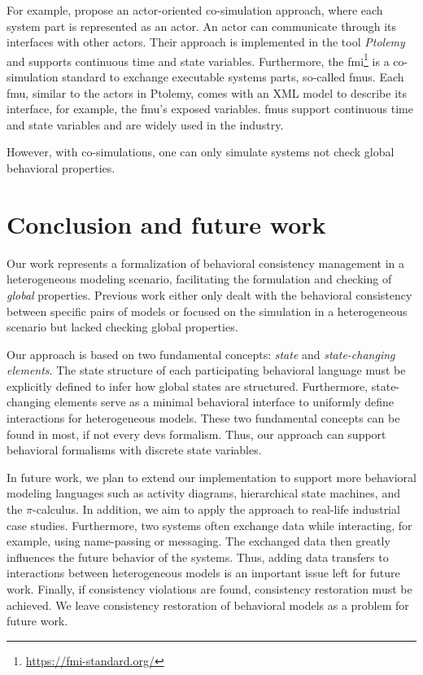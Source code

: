 \documentclass{jot}
\begin{document}
For example, \cite{ekerTamingHeterogeneityPtolemy2003} propose an actor-oriented co-simulation approach, where each system part is represented as an actor.
An actor can communicate through its interfaces with other actors.
Their approach is implemented in the tool \textit{Ptolemy} and supports continuous time and state variables.
Furthermore, the \gls*{fmi}\footnote{\url{https://fmi-standard.org/}} is a co-simulation standard to exchange executable systems parts, so-called \glspl*{fmu}.
Each \gls*{fmu}, similar to the actors in Ptolemy, comes with an XML model to describe its interface, for example, the \gls*{fmu}'s exposed variables.
\glspl*{fmu} support continuous time and state variables and are widely used in the industry.

However, with co-simulations, one can only simulate systems not check global behavioral properties.

\section{Conclusion and future work} \label{sec:conclusion_and_future_work}
Our work represents a formalization of behavioral consistency management in a heterogeneous modeling scenario, facilitating the formulation and checking of \textit{global} properties.
Previous work either only dealt with the behavioral consistency between specific pairs of models or focused on the simulation in a heterogeneous scenario but lacked checking global properties.

Our approach is based on two fundamental concepts: \textit{state} and \textit{state-changing elements}.
The state structure of each participating behavioral language must be explicitly defined to infer how global states are structured.
Furthermore, state-changing elements serve as a minimal behavioral interface to uniformly define interactions for heterogeneous models.
These two fundamental concepts can be found in most, if not every \gls*{devs} formalism.
Thus, our approach can support behavioral formalisms with discrete state variables.

In future work, we plan to extend our implementation to support more behavioral modeling languages such as activity diagrams, hierarchical state machines, and the $\pi$-calculus.
In addition, we aim to apply the approach to real-life industrial case studies.
Furthermore, two systems often exchange data while interacting, for example, using name-passing or messaging.
The exchanged data then greatly influences the future behavior of the systems.
Thus, adding data transfers to interactions between heterogeneous models is an important issue left for future work.
Finally, if consistency violations are found, consistency restoration must be achieved.
We leave consistency restoration of behavioral models as a problem for future work.
\end{document}
